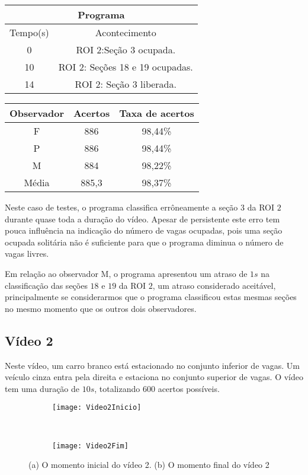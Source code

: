 \begin{center}
\begin{tabular}{|c||c|}
\hline
\multicolumn{2}{|c|}{Programa}  \\ \hline \hline
Tempo(s) & Acontecimento \\ \hline
0 & ROI 2:Seção 3 ocupada. \\ \hline
10 & ROI 2: Seções 18 e 19 ocupadas. \\ \hline
14 & ROI 2: Seção 3 liberada. \\
\hline
\end{tabular}
\end{center}

\begin{center}
\begin{tabular}{|c||c||c|}
\hline
Observador & Acertos & Taxa de acertos \\ \hline
F & 886 & 98,44\% \\  \hline
P & 886 & 98,44\% \\ \hline
M & 884 & 98,22\% \\ \hline
Média & 885,3 & 98,37\% \\
\hline
\end{tabular}
\end{center}

Neste caso de testes, o programa classifica errôneamente a seção $3$ da ROI $2$ durante quase toda a duração do vídeo. Apesar de persistente este erro tem pouca influência na indicação do número de vagas ocupadas, pois uma seção ocupada solitária não é suficiente para que o programa diminua o número de vagas livres.

Em relação ao observador M, o programa apresentou um atraso de $1s$ na classificação das seções $18$ e $19$ da ROI $2$, um atraso considerado aceitável, principalmente se considerarmos que o programa classificou estas mesmas seções no mesmo momento que os outros dois observadores.

\subsection{Vídeo 2}

Neste vídeo, um carro branco está estacionado no conjunto inferior de vagas. Um veículo cinza entra pela direita e estaciona no conjunto superior de vagas. O vídeo tem uma duração de $10s$, totalizando $600$ acertos possíveis.

\begin{figure}[!h]
\centering
\begin{subfigure}{.5\textwidth}
\centering
\texttt{[image: Video2Inicio]}
\caption{}
\end{subfigure}\
\begin{subfigure}{.5\textwidth}
\centering
\texttt{[image: Video2Fim]}
\caption{}
\end{subfigure}
\centering
\caption{(a) O momento inicial do vídeo 2. (b) O momento final do vídeo 2}%
\label{}%
\end{figure}


